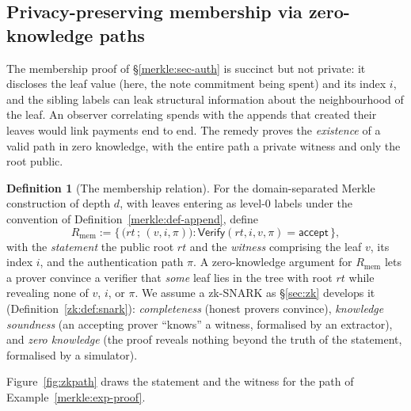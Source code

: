 \documentclass[11pt,a4paper]{article}
\theoremstyle{definition}
\newtheorem{definition}[theorem]{Definition}
\theoremstyle{remark}
\begin{document}
\subsection{Privacy-preserving membership via zero-knowledge paths}
\label{merkle:sec-zk}

The membership proof of \S\ref{merkle:sec-auth} is succinct but not
private: it discloses the leaf value (here, the note commitment being
spent) and its index \(i\), and the sibling labels can leak structural
information about the neighbourhood of the leaf. An observer
correlating spends with the appends that created their leaves would
link payments end to end. The remedy proves the \emph{existence} of a
valid path in zero knowledge, with the entire path a private witness and
only the root public.

\begin{definition}[The membership relation]\label{merkle:def-zk-relation}
For the domain-separated Merkle construction of depth \(d\), with
leaves entering as level-\(0\) labels under the convention of
Definition~\ref{merkle:def-append}, define
\[
R_{\mathrm{mem}} :=
\bigl\{\, \bigl(\mathit{rt} \,;\, (v, i, \pi)\bigr) :
\mathsf{Verify}(\mathit{rt}, i, v, \pi) = \mathsf{accept} \,\bigr\},
\]
with the \emph{statement} the public root \(\mathit{rt}\) and the
\emph{witness} comprising the leaf \(v\), its index \(i\), and the
authentication path \(\pi\). A zero-knowledge argument for
\(R_{\mathrm{mem}}\) lets a prover convince a verifier that
\emph{some} leaf lies in the tree with root \(\mathit{rt}\) while
revealing none of \(v\), \(i\), or \(\pi\). We assume a zk-SNARK as
\S\ref{sec:zk} develops it (Definition~\ref{zk:def:snark}):
\emph{completeness} (honest provers convince), \emph{knowledge
soundness} (an accepting prover ``knows'' a witness, formalised by an
extractor), and \emph{zero knowledge} (the proof reveals nothing
beyond the truth of the statement, formalised by a simulator).
\end{definition}

Figure~\ref{fig:zkpath} draws the statement and the witness for the path of
Example~\ref{merkle:exp-proof}.
\end{document}
